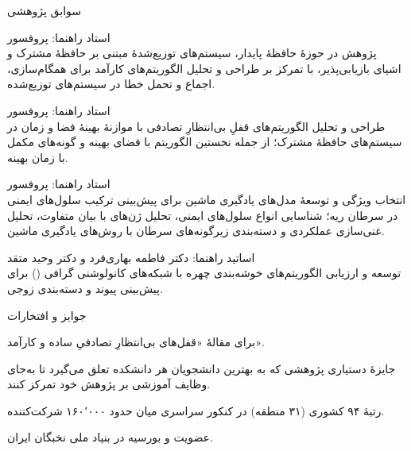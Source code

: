 \documentclass[11pt]{article}
\begin{document}
\begin{faSection}{سوابق پژوهشی}

استاد راهنما: پروفسور \\
پژوهش در حوزۀ حافظۀ پایدار، سیستم‌های توزیع‌شدۀ مبتنی بر حافظۀ مشترک و اشیای بازیابی‌پذیر، با تمرکز بر طراحی و تحلیل الگوریتم‌های کارآمد برای همگام‌سازی، اجماع و تحمل خطا در سیستم‌های توزیع‌شده.

\vspace{0.5em}
استاد راهنما: پروفسور \\
طراحی و تحلیل الگوریتم‌های قفلِ بی‌انتظارِ تصادفی با موازنۀ بهینۀ فضا و زمان در سیستم‌های حافظۀ مشترک؛ از جمله نخستین الگوریتم با فضای بهینه و گونه‌های مکمل با زمان بهینه.

\vspace{0.5em}
استاد راهنما: پروفسور \\
انتخاب ویژگی و توسعۀ مدل‌های یادگیری ماشین برای پیش‌بینی ترکیب سلول‌های ایمنی در سرطان ریه؛ شناسایی انواع سلول‌های ایمنی، تحلیل ژن‌های با بیان متفاوت، تحلیل غنی‌سازی عملکردی و دسته‌بندی زیرگونه‌های سرطان با روش‌های یادگیری ماشین.

\vspace{0.5em}
اساتید راهنما: دکتر فاطمه بهاری‌فرد و دکتر وحید متقد\\
توسعه و ارزیابی الگوریتم‌های خوشه‌بندی چهره با شبکه‌های کانولوشنی گرافی () برای پیش‌بینی پیوند و دسته‌بندی زوجی.

\end{faSection}

\begin{faSection}{جوایز و افتخارات}

برای مقالۀ «قفل‌های بی‌انتظارِ تصادفیِ ساده و کارآمد».

\vspace{0.4em}
جایزۀ دستیاری پژوهشی که به بهترین دانشجویان هر دانشکده تعلق می‌گیرد تا به‌جای وظایف آموزشی بر پژوهش خود تمرکز کنند.

\vspace{0.4em}
رتبۀ ۹۴ کشوری (۳۱ منطقه) در کنکور سراسری میان حدود ۱۶۰٬۰۰۰ شرکت‌کننده.

\vspace{0.4em}
عضویت و بورسیه در بنیاد ملی نخبگان ایران.

\end{faSection}
\end{document}
